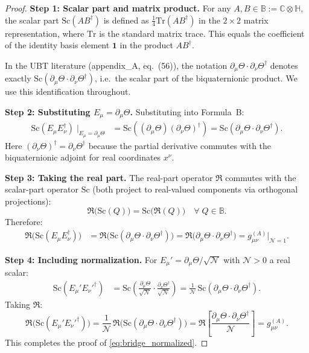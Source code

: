 \documentclass[12pt]{article}
\theoremstyle{definition}
\theoremstyle{remark}
\begin{document}
\begin{proof}
\textbf{Step 1: Scalar part and matrix product.}
For any $A, B \in \mathbb{B} := \mathbb{C}\otimes\mathbb{H}$, the scalar part
$\mathrm{Sc}(AB^\dagger)$ is defined as $\tfrac{1}{4}\mathrm{Tr}(AB^\dagger)$
in the $2\times 2$ matrix representation, where $\mathrm{Tr}$ is the standard
matrix trace.  This equals the coefficient of the identity basis element
$\mathbf{1}$ in the product $AB^\dagger$.

In the UBT literature (appendix\_A, eq.~(56)), the notation
$\partial_\mu\Theta\cdot\partial_\nu\Theta^\dagger$ denotes exactly
$\mathrm{Sc}(\partial_\mu\Theta\cdot\partial_\nu\Theta^\dagger)$, i.e.\ the scalar part
of the biquaternionic product.  We use this identification throughout.

\textbf{Step 2: Substituting $E_\mu = \partial_\mu\Theta$.}
Substituting into Formula~B:
\begin{align}
  \mathrm{Sc}(E_\mu E_\nu^\dagger)
  \;\Big|_{E_\mu = \partial_\mu\Theta}
  &= \mathrm{Sc}((\partial_\mu\Theta)(\partial_\nu\Theta)^\dagger)
   = \mathrm{Sc}(\partial_\mu\Theta\cdot\partial_\nu\Theta^\dagger).
\end{align}
Here $(\partial_\nu\Theta)^\dagger = \partial_\nu\Theta^\dagger$ because the partial
derivative commutes with the biquaternionic adjoint for real coordinates $x^\nu$.

\textbf{Step 3: Taking the real part.}
The real-part operator $\Re$ commutes with the scalar-part operator $\mathrm{Sc}$
(both project to real-valued components via orthogonal projections):
\begin{equation}
  \Re\!\bigl(\mathrm{Sc}(Q)\bigr) = \mathrm{Sc}\!\bigl(\Re(Q)\bigr)
  \quad\forall\; Q\in\mathbb{B}.
\end{equation}
Therefore:
\begin{align}
  \Re\!\bigl(\mathrm{Sc}(E_\mu E_\nu^\dagger)\bigr)
  &= \Re\!\bigl(\mathrm{Sc}(\partial_\mu\Theta\cdot\partial_\nu\Theta^\dagger)\bigr)
   = \Re\!\bigl(\partial_\mu\Theta\cdot\partial_\nu\Theta^\dagger\bigr)
   = g_{\mu\nu}^{(A)}\big|_{\mathcal{N}=1}.
\end{align}

\textbf{Step 4: Including normalization.}
For $E_\mu' = \partial_\mu\Theta/\sqrt{\mathcal{N}}$ with $\mathcal{N}>0$ a real scalar:
\begin{align}
  \mathrm{Sc}(E_\mu' E_\nu'^\dagger)
  &= \mathrm{Sc}\!\!\left(\frac{\partial_\mu\Theta}{\sqrt{\mathcal{N}}}
    \cdot\frac{\partial_\nu\Theta^\dagger}{\sqrt{\mathcal{N}}}\right)
   = \frac{1}{\mathcal{N}}\,\mathrm{Sc}(\partial_\mu\Theta\cdot\partial_\nu\Theta^\dagger).
\end{align}
Taking $\Re$:
\[
  \Re\!\bigl(\mathrm{Sc}(E_\mu' E_\nu'^\dagger)\bigr)
  = \frac{1}{\mathcal{N}}\,\Re\!\bigl(\mathrm{Sc}(\partial_\mu\Theta\cdot\partial_\nu\Theta^\dagger)\bigr)
  = \Re\!\left[\frac{\partial_\mu\Theta\cdot\partial_\nu\Theta^\dagger}{\mathcal{N}}\right]
  = g_{\mu\nu}^{(A)}.
\]
This completes the proof of \eqref{eq:bridge_normalized}.
\end{proof}
\end{document}

